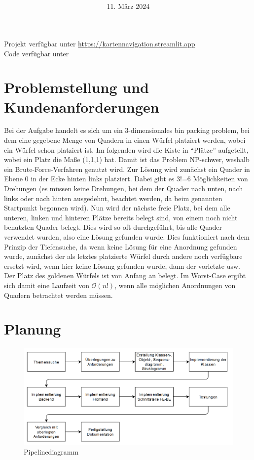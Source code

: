 \documentclass[a4paper,10pt,ngerman]{scrartcl}
\title{\textbf{\Huge\Aufgabe}}
\author{\LARGE \Namen\\\\}
\date{\LARGE11. März 2024}
\begin{document}
\maketitle
\tableofcontents

\vspace{0.5cm}

Projekt verfügbar unter \url{https://kartennavigation.streamlit.app}\\
Code verfügbar unter \url{}

\section{Problemstellung und Kundenanforderungen}
Bei der Aufgabe handelt es sich um ein 3-dimensionales bin packing problem, bei dem eine gegebene Menge von Quadern in einen Würfel platziert werden, wobei ein Würfel schon platziert ist. Im folgenden wird die Kiste in “Plätze” aufgeteilt, wobei ein Platz die Maße (1,1,1) hat. Damit ist das Problem NP-schwer, weshalb ein Brute-Force-Verfahren genutzt wird. Zur Lösung wird zunächst ein Quader in Ebene 0 in der Ecke hinten links platziert. Dabei gibt es 3!=6 Möglichkeiten von Drehungen (es müssen keine Drehungen, bei dem der Quader nach unten, nach links oder nach hinten ausgedehnt,  beachtet werden, da beim genannten Startpunkt begonnen wird). Nun wird der nächste freie Platz, bei dem alle unteren, linken und hinteren Plätze bereits belegt sind, von einem noch nicht benutzten Quader belegt. Dies wird so oft durchgeführt, bis alle Quader verwendet wurden, also eine Lösung gefunden wurde. Dies funktioniert nach dem Prinzip der Tiefensuche, da wenn keine Lösung für eine Anordnung gefunden wurde, zunächst der als letztes platzierte Würfel durch andere noch verfügbare ersetzt wird, wenn hier keine Lösung gefunden wurde, dann der vorletzte usw. Der Platz des goldenen Würfels ist von Anfang an belegt. Im Worst-Case ergibt sich damit eine Laufzeit von $\mathcal{O}(n!)$, wenn alle möglichen Anordnungen von Quadern betrachtet werden müssen.

\newpage
\section{Planung}
\begin{figure}[!ht]
  \center
  \includegraphics[width=\textwidth]{Pipelinediagramm.png}
  \vspace{-.5cm}
  \caption{Pipelinediagramm}
\end{figure}
\end{document}
